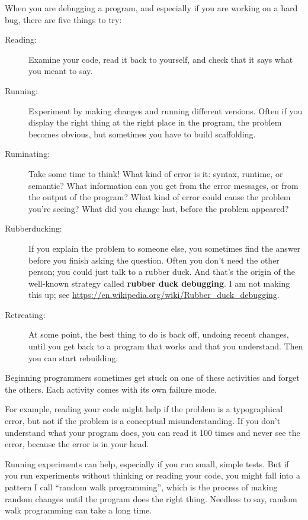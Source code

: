 \documentclass[10pt]{book}
\begin{document}
When you are debugging a program, and especially if you are
working on a hard bug, there are five things to try:

\begin{description}

\item[Reading:] Examine your code, read it back to yourself, and
check that it says what you meant to say.

\item[Running:] Experiment by making changes and running different
versions.  Often if you display the right thing at the right place
in the program, the problem becomes obvious, but sometimes you have to
build scaffolding.

\item[Ruminating:] Take some time to think!  What kind of error
is it: syntax, runtime, or semantic?  What information can you get from
the error messages, or from the output of the program?  What kind of
error could cause the problem you're seeing?  What did you change
last, before the problem appeared?

\item[Rubberducking:] If you explain the problem to someone else, you
  sometimes find the answer before you finish asking the question.
  Often you don't need the other person; you could just talk to a rubber
  duck.  And that's the origin of the well-known strategy called {\bf
    rubber duck debugging}.  I am not making this up; see
  \url{https://en.wikipedia.org/wiki/Rubber_duck_debugging}.

\item[Retreating:] At some point, the best thing to do is back
off, undoing recent changes, until you get back to a program that
works and that you understand.  Then you can start rebuilding.

\end{description}

Beginning programmers sometimes get stuck on one of these activities
and forget the others.  Each activity comes with its own failure
mode.

For example, reading your code might help if the problem is a
typographical error, but not if the problem is a conceptual
misunderstanding.  If you don't understand what your program does, you
can read it 100 times and never see the error, because the error is in
your head.

Running experiments can help, especially if you run small, simple
tests.  But if you run experiments without thinking or reading your
code, you might fall into a pattern I call ``random walk programming'',
which is the process of making random changes until the program
does the right thing.  Needless to say, random walk programming
can take a long time.
\end{document}
